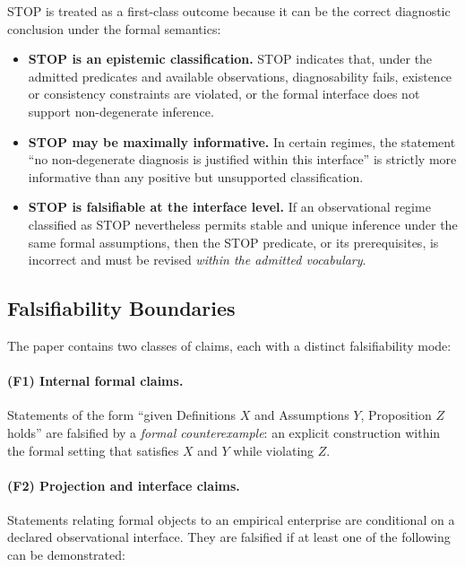 STOP is treated as a first-class outcome because it can be the correct diagnostic
conclusion under the formal semantics:

\begin{itemize}
  \item \textbf{STOP is an epistemic classification.}
  STOP indicates that, under the admitted predicates and available observations,
  diagnosability fails, existence or consistency constraints are violated, or the
  formal interface does not support non-degenerate inference.

  \item \textbf{STOP may be maximally informative.}
  In certain regimes, the statement ``no non-degenerate diagnosis is justified
  within this interface'' is strictly more informative than any positive but
  unsupported classification.

  \item \textbf{STOP is falsifiable at the interface level.}
  If an observational regime classified as STOP nevertheless permits stable and
  unique inference under the same formal assumptions, then the STOP predicate, or
  its prerequisites, is incorrect and must be revised \emph{within the admitted
  vocabulary}.
\end{itemize}

\subsection{Falsifiability Boundaries}
\label{subsec:falsifiability-boundaries}

The paper contains two classes of claims, each with a distinct falsifiability
mode:

\paragraph{(F1) Internal formal claims.}
Statements of the form ``given Definitions $X$ and Assumptions $Y$, Proposition
$Z$ holds'' are falsified by a \emph{formal counterexample}: an explicit
construction within the formal setting that satisfies $X$ and $Y$ while
violating $Z$.

\paragraph{(F2) Projection and interface claims.}
Statements relating formal objects to an empirical enterprise are conditional on
a declared observational interface.
They are falsified if at least one of the following can be demonstrated:

